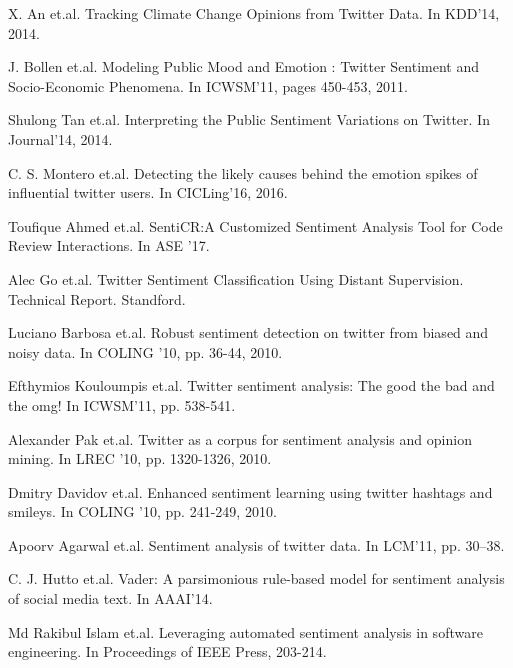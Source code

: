 \documentclass[runningheads]{llncs}
\begin{document}
\begin{thebibliography}{8}
X. An et.al.
\newblock Tracking Climate Change Opinions from Twitter Data. 
\newblock In KDD’14, 2014.

J. Bollen et.al.
\newblock Modeling Public Mood and Emotion : Twitter Sentiment and Socio-Economic Phenomena. 
\newblock In ICWSM’11, pages 450-453, 2011.

Shulong Tan et.al.
\newblock Interpreting the Public Sentiment Variations on Twitter. 
\newblock In Journal’14, 2014.

C. S. Montero et.al.
\newblock Detecting the likely causes behind the emotion spikes of influential twitter users. 
\newblock In CICLing’16, 2016.

Toufique Ahmed et.al.
\newblock SentiCR:A Customized Sentiment Analysis Tool for Code Review Interactions.
\newblock In ASE ’17.

Alec Go et.al.
\newblock Twitter Sentiment Classification Using Distant Supervision.
\newblock Technical Report. Standford.

Luciano Barbosa et.al.
\newblock Robust sentiment detection on twitter from biased and noisy data.
\newblock In COLING ’10, pp. 36-44, 2010.

Efthymios Kouloumpis et.al.
\newblock Twitter sentiment analysis: The good the bad and the omg!
\newblock In ICWSM’11, pp. 538-541.

Alexander Pak et.al.
\newblock Twitter as a corpus for sentiment analysis and opinion mining.
\newblock In LREC ’10, pp. 1320-1326, 2010.

Dmitry Davidov et.al.
\newblock Enhanced sentiment learning using twitter hashtags and smileys.
\newblock In COLING ’10, pp. 241-249, 2010.

Apoorv Agarwal et.al.
\newblock Sentiment analysis of twitter data.
\newblock In LCM’11, pp. 30–38.

C. J. Hutto et.al.
\newblock Vader: A parsimonious rule-based model for sentiment analysis of social media text.
\newblock In AAAI’14.

Md Rakibul Islam et.al.
\newblock Leveraging automated sentiment analysis in software engineering. 
\newblock In Proceedings of IEEE Press, 203-214.


\end{thebibliography}
\end{document}
